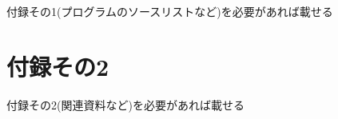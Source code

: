 \documentclass{funthesis}
\begin{document}
付録その1(プログラムのソースリストなど)を必要があれば載せる

\chapter*{付録その2}

付録その2(関連資料など)を必要があれば載せる

\listoffigures

\listoftables
\end{document}
